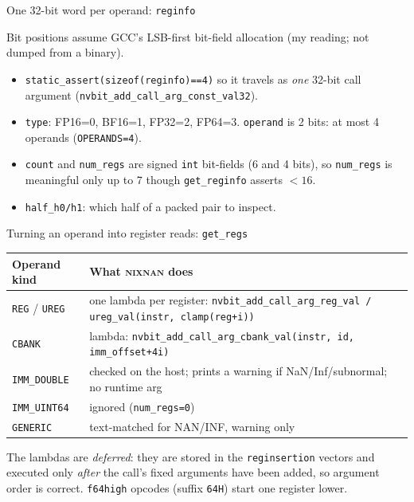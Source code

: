 \documentclass[aspectratio=169,10pt]{beamer}
\newcommand{\nn}{\textsc{nixnan}}
\begin{document}
\begin{frame}{One 32-bit word per operand: \texttt{reginfo}}
\centering
{}

\small\raggedright Bit positions assume GCC's LSB-first bit-field allocation (my reading; not dumped from a binary).
\begin{itemize}\small
\item \texttt{static\_assert(sizeof(reginfo)==4)} so it travels as \emph{one} 32-bit call argument (\texttt{nvbit\_add\_call\_arg\_const\_val32}).
\item \texttt{type}: FP16=0, BF16=1, FP32=2, FP64=3. \texttt{operand} is 2 bits: at most 4 operands (\texttt{OPERANDS=4}).
\item \texttt{count} and \texttt{num\_regs} are signed \texttt{int} bit-fields (6 and 4 bits), so \texttt{num\_regs} is meaningful only up to 7 though \texttt{get\_reginfo} asserts $<16$.
\item \texttt{half\_h0/h1}: which half of a packed pair to inspect.
\end{itemize}
\end{frame}

\begin{frame}{Turning an operand into register reads: \texttt{get\_regs}}
\small
\begin{tabular}{@{}l>{\raggedright\arraybackslash}p{}@{}}
\textbf{Operand kind} & \textbf{What \nn{} does}\\\hline
\texttt{REG} / \texttt{UREG} & one lambda per register: \texttt{nvbit\_add\_call\_arg\_reg\_val / ureg\_val(instr, clamp(reg+i))}\\
\texttt{CBANK} & lambda: \texttt{nvbit\_add\_call\_arg\_cbank\_val(instr, id, imm\_offset+4i)}\\
\texttt{IMM\_DOUBLE} & checked on the host; prints a warning if NaN/Inf/subnormal; no runtime arg\\
\texttt{IMM\_UINT64} & ignored (\texttt{num\_regs=0})\\
\texttt{GENERIC} & text-matched for NAN/INF, warning only\\
\end{tabular}

\medskip
The lambdas are \emph{deferred}: they are stored in the \texttt{reginsertion} vectors and executed only \emph{after} the call's fixed arguments have been added, so argument order is correct. \texttt{f64high} opcodes (suffix \texttt{64H}) start one register lower.
\end{frame}
\end{document}
